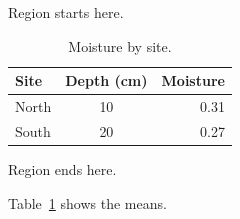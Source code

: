 \documentclass[11pt]{article}
\begin{document}
Region starts here.

\begin{table}[ht]
\centering
\caption{Moisture by site.}\label{tab:sites}
\begin{tabular}{|l|c|r|}
\hline
Site & Depth (cm) & Moisture \\
\hline
North & 10 & 0.31 \\
\hline
South & 20 & 0.27 \\
\hline
\end{tabular}
\end{table}

Region ends here.

Table~\ref{tab:sites} shows the means.
\end{document}
